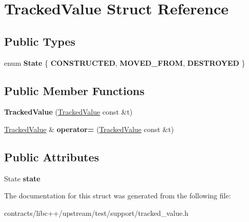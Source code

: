 \hypertarget{struct_tracked_value}{}\section{Tracked\+Value Struct Reference}
\label{struct_tracked_value}
\subsection*{Public Types}
\begin{DoxyCompactItemize}
\item 
\mbox{\label{struct_tracked_value_aaaf06c0ca38ea3d887a191c62bda26ab}} 
enum {\bfseries State} \{ {\bfseries C\+O\+N\+S\+T\+R\+U\+C\+T\+ED}, 
{\bfseries M\+O\+V\+E\+D\+\_\+\+F\+R\+OM}, 
{\bfseries D\+E\+S\+T\+R\+O\+Y\+ED}
 \}
\end{DoxyCompactItemize}
\subsection*{Public Member Functions}
\begin{DoxyCompactItemize}
\item 
\mbox{\label{struct_tracked_value_a55cca7a221e4ab2bbd3771329fe2bec5}} 
{\bfseries Tracked\+Value} (\mbox{\hyperlink{struct_tracked_value}{Tracked\+Value}} const \&t)
\item 
\mbox{\label{struct_tracked_value_acd85470b5ecc497299be8488f8af75d6}} 
\mbox{\hyperlink{struct_tracked_value}{Tracked\+Value}} \& {\bfseries operator=} (\mbox{\hyperlink{struct_tracked_value}{Tracked\+Value}} const \&t)
\end{DoxyCompactItemize}
\subsection*{Public Attributes}
\begin{DoxyCompactItemize}
\item 
\mbox{\label{struct_tracked_value_a42410b153725edae227b9aea4be75ffd}} 
State {\bfseries state}
\end{DoxyCompactItemize}


The documentation for this struct was generated from the following file\+:\begin{DoxyCompactItemize}
\item 
contracts/libc++/upstream/test/support/tracked\+\_\+value.\+h\end{DoxyCompactItemize}
